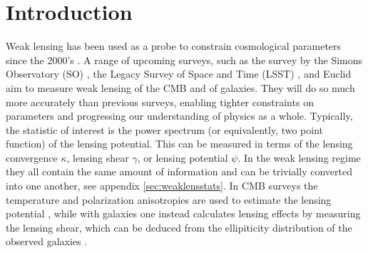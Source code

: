 \documentclass[11pt]{article} %
\begin{document}


\section{Introduction}

Weak lensing has been used as a probe to constrain cosmological parameters since the 2000's \cite{kilbinger2015cosmology,Bacon2000,Kaiser2000,Waerbeke2000,Bartelmann2001}. A range of upcoming surveys, such as the survey by the Simons Observatory (SO) \cite{Ade2019}, the Legacy Survey of Space and Time (LSST) \cite{Ivezic2019}, and Euclid \cite{Laureijs2011} aim to measure weak lensing of the CMB and of galaxies. They will do so much more accurately than previous surveys, enabling tighter constraints on parameters and progressing our understanding of physics as a whole. Typically, the statistic of interest is the power spectrum (or equivalently, two point function) of the lensing potential. This can be measured in terms of the lensing convergence $\kappa$, lensing shear $\gamma$, or lensing potential $\psi$. In the weak lensing regime they all contain the same amount of information and can be trivially converted into one another, see appendix \ref{sec:weaklensstats}. In CMB surveys the temperature and polarization anisotropies are used to estimate the lensing potential \cite{Planck2018Lensing}, while with galaxies one instead calculates lensing effects by measuring the lensing shear, which can be deduced from the ellipiticity distribution of the observed galaxies \cite{HoekstraJain2008}.
\end{document}
